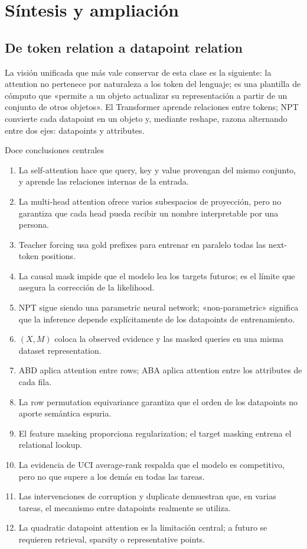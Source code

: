 \section{Síntesis y ampliación}

\subsection{De token relation a datapoint relation}

La visión unificada que más vale conservar de esta clase es la siguiente: la attention no pertenece por naturaleza a los token del lenguaje; es una plantilla de cómputo que «permite a un objeto actualizar su representación a partir de un conjunto de otros objetos». El Transformer aprende relaciones entre tokens; NPT convierte cada datapoint en un objeto y, mediante reshape, razona alternando entre dos ejes: datapoints y attributes.

\begin{importantbox}{Doce conclusiones centrales}
\begin{enumerate}
  \item La self-attention hace que query, key y value provengan del mismo conjunto, y aprende las relaciones internas de la entrada.
  \item La multi-head attention ofrece varios subespacios de proyección, pero no garantiza que cada head pueda recibir un nombre interpretable por una persona.
  \item Teacher forcing usa gold prefixes para entrenar en paralelo todas las next-token positions.
  \item La causal mask impide que el modelo lea los targets futuros; es el límite que asegura la corrección de la likelihood.
  \item NPT sigue siendo una parametric neural network; «non-parametric» significa que la inference depende explícitamente de los datapoints de entrenamiento.
  \item $(X,M)$ coloca la observed evidence y las masked queries en una misma dataset representation.
  \item ABD aplica attention entre rows; ABA aplica attention entre los attributes de cada fila.
  \item La row permutation equivariance garantiza que el orden de los datapoints no aporte semántica espuria.
  \item El feature masking proporciona regularization; el target masking entrena el relational lookup.
  \item La evidencia de UCI average-rank respalda que el modelo es competitivo, pero no que supere a los demás en todas las tareas.
  \item Las intervenciones de corruption y duplicate demuestran que, en varias tareas, el mecanismo entre datapoints realmente se utiliza.
  \item La quadratic datapoint attention es la limitación central; a futuro se requieren retrieval, sparsity o representative points.
\end{enumerate}
\end{importantbox}

